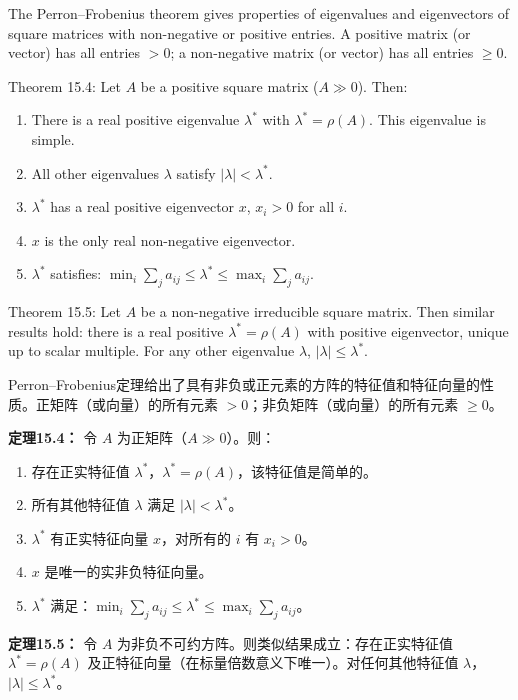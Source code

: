 \begin{original}
The Perron--Frobenius theorem gives properties of eigenvalues and eigenvectors of square matrices with non-negative or positive entries. A positive matrix (or vector) has all entries $> 0$; a non-negative matrix (or vector) has all entries $\ge 0$.

Theorem 15.4: Let $A$ be a positive square matrix ($A \gg 0$). Then:
\begin{enumerate}
\item There is a real positive eigenvalue $\lambda^*$ with $\lambda^* = \rho(A)$. This eigenvalue is simple.
\item All other eigenvalues $\lambda$ satisfy $|\lambda| < \lambda^*$.
\item $\lambda^*$ has a real positive eigenvector $x$, $x_i > 0$ for all $i$.
\item $x$ is the only real non-negative eigenvector.
\item $\lambda^*$ satisfies: $\min_i \sum_j a_{ij} \le \lambda^* \le \max_i \sum_j a_{ij}$.
\end{enumerate}

Theorem 15.5: Let $A$ be a non-negative irreducible square matrix. Then similar results hold: there is a real positive $\lambda^* = \rho(A)$ with positive eigenvector, unique up to scalar multiple. For any other eigenvalue $\lambda$, $|\lambda| \le \lambda^*$.
\end{original}
\begin{translation}
Perron--Frobenius定理给出了具有非负或正元素的方阵的特征值和特征向量的性质。正矩阵（或向量）的所有元素 $> 0$；非负矩阵（或向量）的所有元素 $\ge 0$。

\textbf{定理15.4：} 令 $A$ 为正矩阵（$A \gg 0$）。则：
\begin{enumerate}
\item 存在正实特征值 $\lambda^*$，$\lambda^* = \rho(A)$，该特征值是简单的。
\item 所有其他特征值 $\lambda$ 满足 $|\lambda| < \lambda^*$。
\item $\lambda^*$ 有正实特征向量 $x$，对所有的 $i$ 有 $x_i > 0$。
\item $x$ 是唯一的实非负特征向量。
\item $\lambda^*$ 满足：$\min_i \sum_j a_{ij} \le \lambda^* \le \max_i \sum_j a_{ij}$。
\end{enumerate}

\textbf{定理15.5：} 令 $A$ 为非负不可约方阵。则类似结果成立：存在正实特征值 $\lambda^* = \rho(A)$ 及正特征向量（在标量倍数意义下唯一）。对任何其他特征值 $\lambda$，$|\lambda| \le \lambda^*$。
\end{translation}

